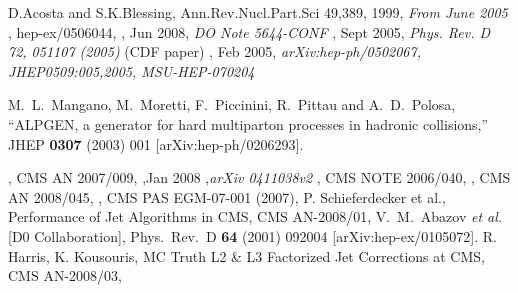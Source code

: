 


%

\begin{thebibliography}{9}
   {D.Acosta and S.K.Blessing, Ann.Rev.Nucl.Part.Sci 49,389},
    1999,
    {\em From June 2005}
  , hep-ex/0506044,
  , Jun 2008,
  {\em DO Note 5644-CONF}
  , Sept 2005,
  {\em Phys. Rev. D 72, 051107 (2005)} (CDF paper)
  , Feb 2005,
  {\em arXiv:hep-ph/0502067, JHEP0509:005,2005, MSU-HEP-070204}
  

    M.~L.~Mangano, M.~Moretti, F.~Piccinini, R.~Pittau and A.~D.~Polosa,
    ``ALPGEN, a generator for hard multiparton processes in hadronic collisions,''
    JHEP {\bf 0307} (2003) 001
    [arXiv:hep-ph/0206293].

  , CMS AN 2007/009,
  ,Jan 2008 ,{\em arXiv 0411038v2}
  , CMS NOTE 2006/040,
  , CMS AN 2008/045,
  , CMS PAS EGM-07-001 (2007),
   {P. Schieferdecker et al., Performance of Jet Algorithms in CMS}, CMS AN-2008/01,
    V.~M.~Abazov {\it et al.}  [D0 Collaboration], 	 
    Phys.\ Rev.\  D {\bf 64} (2001) 092004 	 
    [arXiv:hep-ex/0105072]. 	 
   {R. Harris, K. Kousouris, MC Truth L2 \& L3 Factorized Jet Corrections at CMS}, CMS AN-2008/03,
 
 
 \end{thebibliography}
 

%
